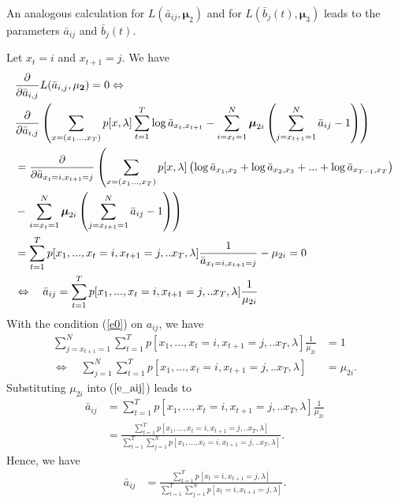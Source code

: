 \documentclass{article}
\begin{document}
An analogous calculation for $L(\bar a_{ij},\boldsymbol \mu_2)$ and for $L(\bar b_j(t),\boldsymbol \mu_3)$ leads to the parameters $\bar a_{ij}$ and $\bar b_j(t)$.


Let $x_t = i$ and  $x_{t+1} = j$. We have 
\begin{align} 
 &\frac{\partial}{\partial \bar a_{i,j}} L(\bar a_{i,j},{\bf{\mu_2}}) = 0 \Leftrightarrow \\
 &\frac{\partial}{\partial \bar a_{i,j}} \left( \sum_{x = (x_1...,x_T)}  p[x,\lambda] \sum_{t=1}^T \log \bar a_{x_t,x_{t+1}} -\sum_{i=x_{t}=1}^N\boldsymbol \mu_{2i}\left(\sum_{j=x_{t+1}=1}^N \bar a_{ij}  - 1\right) \right) \label{e3} \nonumber \\
&=
\frac{\partial}{\partial \bar a_{x_t=i,x_{t+1}=j}} \left( \sum_{x = (x_1...,x_T)}  p[x,\lambda] \left(\log \bar a_{x_1,x_2}+\log \bar a_{x_2,x_3}+...+\log \bar a_{x_{T-1},x_{T}}\right) \right. \\ \nonumber
&-  \left. \sum_{i=x_{t}=1}^N\boldsymbol \mu_{2i} \left( \sum_{j=x_{t+1}=1}^N \bar a_{ij}  - 1 \right)  \right) \label{e3} \\
&=  
\sum_{t=1}^T p[x_1,...,x_t=i,x_{t+1}=j,..x_T,\lambda]  \frac{1}{\bar a_{x_t=i,x_{t+1}=j}} - \mu_{2i} = 0 \label{e4} \\
&\Leftrightarrow \quad
 \bar a_{ij} = \sum_{t=1}^T  p[x_1,...,x_t=i,x_{t+1}=j,..x_T,\lambda]  \frac{1}{\mu_{2i}} \label{e_aij}
\end{align}
With the condition (\ref{e0}) on $a_{ij}$, we have
\begin{align}
    \sum_{j = x_{t+1}=1}^N \sum_{t=1}^T  p[x_1,...,x_t=i,x_{t+1}=j,..x_T,\lambda]  \frac{1}{\mu_{2i}}&=1  \\
    \Leftrightarrow \quad
    \sum_{j=1}^N \sum_{t=1}^T p[x_1,...,x_t=i,x_{t+1}=j,..x_T,\lambda]&= \mu_{2i}.
\end{align}
Substituting $\mu_{2i}$ into ($\ref{e_aij}$) leads to
\begin{align}
    \bar a_{ij} &= \sum_{t=1}^T  p[x_1,...,x_t=i,x_{t+1}=j,..x_T,\lambda]  \frac{1}{\mu_{2i}} \\
    &= \frac{\sum_{t=1}^T  p[x_1,...,x_t=i,x_{t+1}=j,..x_T,\lambda]}  {\sum_{t=1}^T \sum_{j =1}^N p[x_1,...,x_t=i,x_{t+1}=j,..x_T,\lambda]}.
\end{align}
Hence, we have
\begin{align}
\bar a_{ij} &= \frac{\sum_{t=1}^T  p[x_t=i,x_{t+1}=j,\lambda]}  {\sum_{t=1}^T \sum_{j =1}^N p[x_t=i,x_{t+1}=j,\lambda]}.
\end{align}
\end{document}
